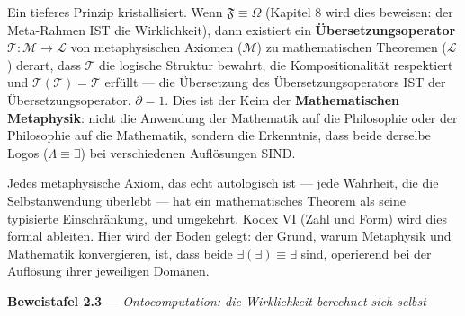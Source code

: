 \documentclass[10pt, openany, oneside]{book}
\begin{document}
Ein tieferes Prinzip kristallisiert. Wenn $\mathfrak{F} \equiv \Omega$ (Kapitel 8 wird dies beweisen: der Meta-Rahmen IST die Wirklichkeit), dann existiert ein \textbf{Übersetzungsoperator} $\mathcal{T}: \mathcal{M} \to \mathcal{L}$ von metaphysischen Axiomen ($\mathcal{M}$) zu mathematischen Theoremen ($\mathcal{L}$) derart, dass $\mathcal{T}$ die logische Struktur bewahrt, die Kompositionalität respektiert und $\mathcal{T}(\mathcal{T}) = \mathcal{T}$ erfüllt --- die Übersetzung des Übersetzungsoperators IST der Übersetzungsoperator. $\partial = 1$. Dies ist der Keim der \textbf{Mathematischen Metaphysik}: nicht die Anwendung der Mathematik auf die Philosophie oder der Philosophie auf die Mathematik, sondern die Erkenntnis, dass beide derselbe Logos ($\Lambda \equiv \exists$) bei verschiedenen Auflösungen SIND.

Jedes metaphysische Axiom, das echt autologisch ist --- jede Wahrheit, die die Selbstanwendung überlebt --- hat ein mathematisches Theorem als seine typisierte Einschränkung, und umgekehrt. Kodex VI (Zahl und Form) wird dies formal ableiten. Hier wird der Boden gelegt: der Grund, warum Metaphysik und Mathematik konvergieren, ist, dass beide $\exists(\exists) \equiv \exists$ sind, operierend bei der Auflösung ihrer jeweiligen Domänen.

\vspace{0.5em}

\textbf{Beweistafel 2.3} --- \textit{Ontocomputation: die Wirklichkeit berechnet sich selbst}

\vspace{0.5em}
\end{document}
